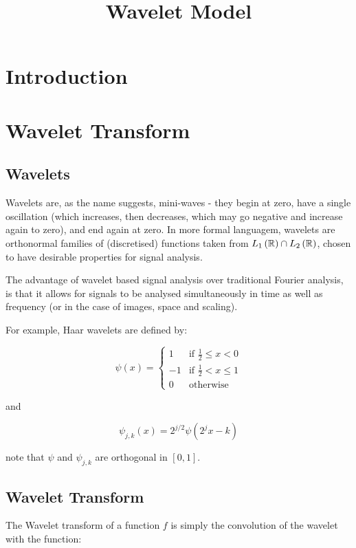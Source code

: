 \documentclass{article}
\title{Wavelet Model}
\begin{document}
\maketitle

\section{Introduction}


\section{Wavelet Transform}

\subsection{Wavelets}
Wavelets are, as the name suggests, mini-waves - they begin at zero, have a single oscillation (which increases, then decreases, which may go negative and increase again to zero), and end again at zero. In more formal languagem, wavelets are orthonormal families of (discretised) functions taken from \(L_1\left({\mathbb{R}}\right) \cap L_2\left({\mathbb{R}}\right)\), chosen to have desirable properties for signal analysis. 

The advantage of wavelet based signal analysis over traditional Fourier analysis, is that it allows for signals to be analysed simultaneously in time as well as frequency (or in the case of images, space and scaling). 

For example, Haar wavelets are defined by:

\begin{equation}
\psi\left(x\right) =
\begin{cases}
 1 & \text{if } \frac{1}{2} \leq	x < 0 \\
-1 & \text{if } \frac{1}{2} <  x \leq 1 \\
0 & \text{otherwise} 
\end{cases}
\end{equation}

and 

\begin{equation}
\psi_{j,k}\left(x\right) = 2^{j/2}\psi\left(2^j x - k\right)
\end{equation}

note that \(\psi\) and \(\psi_{j,k}\) are orthogonal in \([0,1]\). 

\subsection{Wavelet Transform}
The Wavelet transform of a function \(f\) is simply the convolution of the wavelet with the function:
\end{document}

